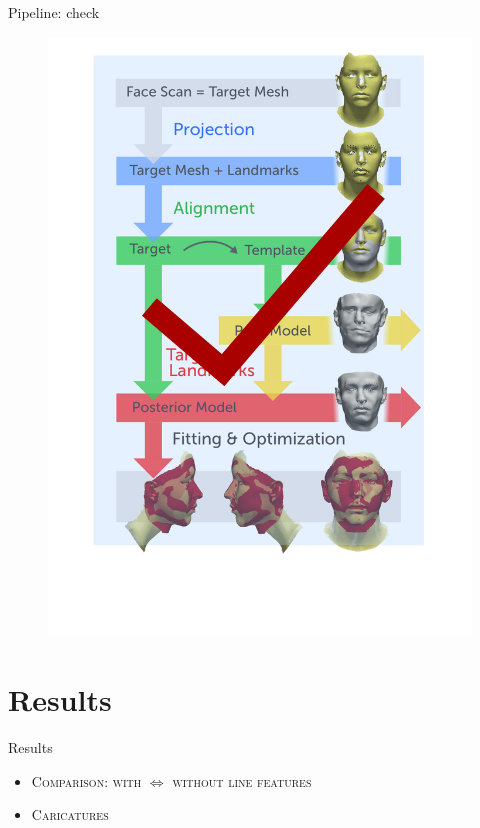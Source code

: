 \documentclass[xcolor=x11names,compress]{beamer}
\begin{document}
\begin{frame}{Pipeline: check}
\begin{figure}
    \includegraphics[width=.5\textwidth]{../resources/figures/pipeline_checked.pdf}
\end{figure}
\end{frame}

\section{Results}
\begin{frame}{Results}
\begin{itemize}
    \item    {\scshape Comparison: with $\Leftrightarrow$ without line features}
    \vfill
\item {\scshape Caricatures}
\end{itemize}
\end{frame}
\end{document}
